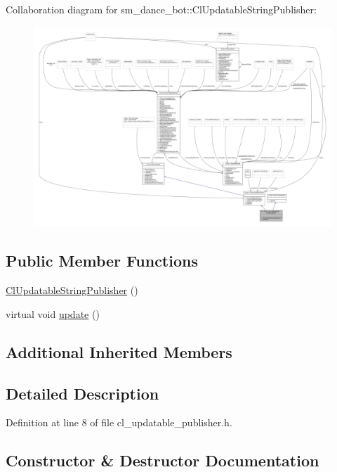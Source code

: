 Collaboration diagram for sm\+\_\+dance\+\_\+bot\+:\+:Cl\+Updatable\+String\+Publisher\+:
\nopagebreak
\begin{figure}[H]
\begin{center}
\leavevmode
\includegraphics[width=350pt]{classsm__dance__bot_1_1ClUpdatableStringPublisher__coll__graph}
\end{center}
\end{figure}
\subsection*{Public Member Functions}
\begin{DoxyCompactItemize}
\item 
\hyperlink{classsm__dance__bot_1_1ClUpdatableStringPublisher_aeb54570ad6b7a6b0ff753547988bc5ef}{Cl\+Updatable\+String\+Publisher} ()
\item 
virtual void \hyperlink{classsm__dance__bot_1_1ClUpdatableStringPublisher_a4c30fcd75d41ab016de442c2ece56a4d}{update} ()
\end{DoxyCompactItemize}
\subsection*{Additional Inherited Members}


\subsection{Detailed Description}


Definition at line 8 of file cl\+\_\+updatable\+\_\+publisher.\+h.



\subsection{Constructor \& Destructor Documentation}
